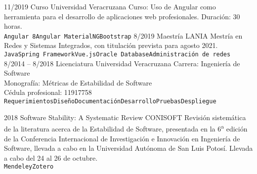 \documentclass[9pt]{developercv} %
\begin{document}

\begin{entrylist}
	\entry
		{11/2019}
		{Curso}
		{Universidad Veracruzana}
        {Curso: Uso de Angular como herramienta para el desarrollo de aplicaciones web profesionales. Duración: 30 horas.\\
        \texttt{Angular 8}\slashsep\texttt{Angular Material}\slashsep\texttt{NGBootstrap}}
	\entry
		{8/2019}
		{Maestría}
		{LANIA}
        {Mestría en Redes y Sistemas Integrados, con titulación prevista para agosto 2021.\\
        \texttt{Java}\slashsep\texttt{Spring Framework}\slashsep\texttt{Vue.js}\slashsep\texttt{Oracle Database}\slashsep\texttt{Administración de redes}}
	\entry
		{8/2014 -- 8/2018}
		{Licenciatura}
		{Universidad Veracruzana}
        {Carrera: Ingeniería de Software\\
        Monografía: Métricas de Estabilidad de Software\\
        Cédula profesional: 11917758\\
        \texttt{Requerimientos}\slashsep\texttt{Diseño}\slashsep\texttt{Documentación}\slashsep\texttt{Desarrollo}\slashsep\texttt{Pruebas}\slashsep\texttt{Despliegue}}
\end{entrylist}



\begin{entrylist}
	\entry
		{2018}
		{Software Stability: A Systematic Review}
		{CONISOFT}
        {Revisión sistemática de la literatura acerca de la Estabilidad de Software, presentada en la 6\textsuperscript{a} edición de la Conferencia Internacional de Investigación e Innovación en Ingeniería de Software, llevada a cabo en la Universidad Autónoma de San Luis Potosí. Llevada a cabo del 24 al 26 de octubre.\\
        \texttt{Mendeley}\slashsep\texttt{Zotero}}
\end{entrylist}



\end{document}
